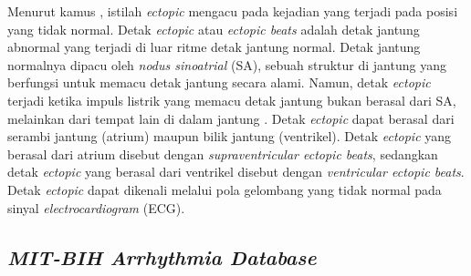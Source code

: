 


Menurut kamus \textcite{merriam-websterDefinitionECTOPIC2024}, istilah \textit{ectopic} mengacu pada kejadian yang terjadi pada posisi yang tidak normal.
Detak \textit{ectopic} atau \textit{ectopic beats} adalah detak jantung abnormal yang terjadi di luar ritme detak jantung normal.
Detak jantung normalnya dipacu oleh \textit{nodus sinoatrial} (SA), sebuah struktur di jantung yang berfungsi untuk memacu detak jantung secara alami.
Namun, detak \textit{ectopic} terjadi ketika impuls listrik yang memacu detak jantung bukan berasal dari SA, melainkan dari tempat lain di dalam jantung \parencite{mahidasaagarEctopicBeats}.
Detak \textit{ectopic} dapat berasal dari serambi jantung (atrium) maupun bilik jantung (ventrikel).
Detak \textit{ectopic} yang berasal dari atrium disebut dengan \textit{supraventricular ectopic beats}, sedangkan detak \textit{ectopic} yang berasal dari ventrikel disebut dengan \textit{ventricular ectopic beats}.
Detak \textit{ectopic} dapat dikenali melalui pola gelombang yang tidak normal pada sinyal \textit{electrocardiogram} (ECG).
%

\subsection{\textit{MIT-BIH Arrhythmia Database}}
\label{subsec: landasan-mitbih}

